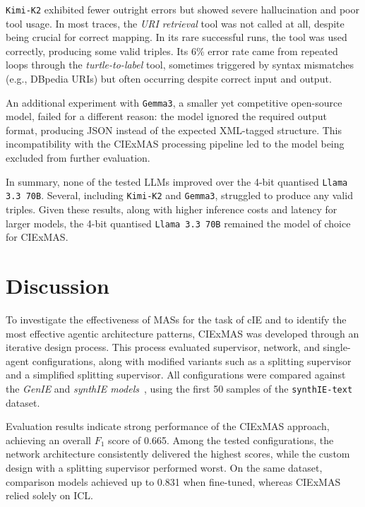 \documentclass[a4paper,oneside,bibliography=totoc]{scrbook}
\begin{document}
\texttt{Kimi-K2} exhibited fewer outright errors but showed severe hallucination and poor tool usage. In most traces, the \textit{URI retrieval} tool was not called at all, despite being crucial for correct mapping. In its rare successful runs, the tool was used correctly, producing some valid triples. Its 6\% error rate came from repeated loops through the \textit{turtle-to-label} tool, sometimes triggered by syntax mismatches (e.g., DBpedia URIs) but often occurring despite correct input and output.

An additional experiment with \texttt{Gemma3}, a smaller yet competitive open-source model, failed for a different reason: the model ignored the required output format, producing JSON instead of the expected XML-tagged structure. This incompatibility with the CIExMAS processing pipeline led to the model being excluded from further evaluation.

In summary, none of the tested \acp{LLM} improved over the 4-bit quantised \texttt{Llama 3.3 70B}. Several, including \texttt{Kimi-K2} and \texttt{Gemma3}, struggled to produce any valid triples. Given these results, along with higher inference costs and latency for larger models, the 4-bit quantised \texttt{Llama 3.3 70B} remained the model of choice for CIExMAS.

\section{Discussion}
\label{sec:discussion}

To investigate the effectiveness of \acp{MAS} for the task of \ac{cIE} and to identify the most effective agentic architecture patterns, CIExMAS was developed through an iterative design process. This process evaluated supervisor, network, and single-agent configurations, along with modified variants such as a splitting supervisor and a simplified splitting supervisor. All configurations were compared against the \textit{GenIE} and \textit{synthIE models}~\cite{Josifoski2021,Josifoski2023}, using the first 50 samples of the \texttt{synthIE-text} dataset.

Evaluation results indicate strong performance of the CIExMAS approach, achieving an overall $F_{1}$ score of 0.665. Among the tested configurations, the network architecture consistently delivered the highest scores, while the custom design with a splitting supervisor performed worst. On the same dataset, comparison models achieved up to 0.831 when fine-tuned, whereas CIExMAS relied solely on \ac{ICL}.
\end{document}
